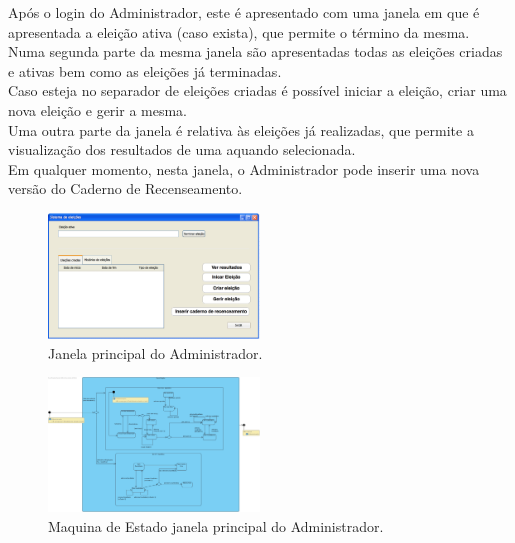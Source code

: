 \documentclass[a4paper,12pt]{report}
\begin{document}
Após o login do Administrador, este é apresentado com uma janela em que é apresentada a eleição ativa (caso exista), que permite o término da mesma.
\\\indent Numa segunda parte da mesma janela são apresentadas todas as eleições criadas e ativas bem como as eleições já terminadas.
\\\indent Caso esteja no separador de eleições criadas é possível iniciar a eleição, criar uma nova eleição e gerir a mesma.
\\\indent Uma outra parte da janela é relativa às eleições já realizadas, que permite a visualização dos resultados de uma aquando selecionada.
\\\indent Em qualquer momento, nesta janela, o Administrador pode inserir uma nova versão do Caderno de Recenseamento. 

\begin{figure}[h]
\begin{center}
	\includegraphics[width=0.5\textwidth]{media/mockup/MainAdmin.png}
	 \caption{Janela principal do Administrador.}
\end{center}
\end{figure}
\begin{figure}[h]
\begin{center}
	\includegraphics[width=0.5\textwidth]{media/MaqEst/m_GerirEleicao.jpg}
	 \caption{Maquina de Estado janela principal do Administrador.}
\end{center}
\end{figure}

\newpage
\end{document}
